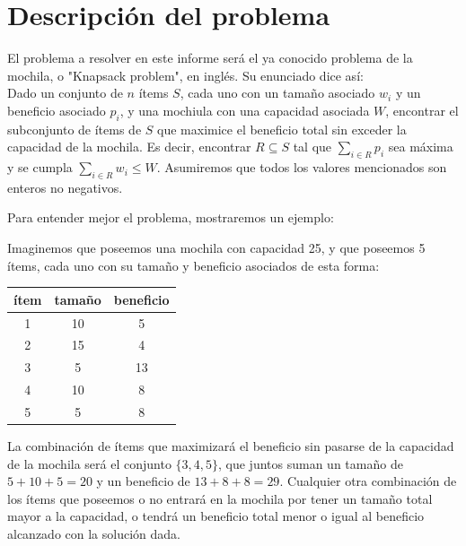 \documentclass[10pt, a4paper]{article}
\begin{document}


\maketitle

\setcounter{page}{1}
\tableofcontents

\pagebreak


\section{Descripci\'on del problema}

El problema a resolver en este informe será el ya conocido problema de la mochila, o "Knapsack problem", en inglés. Su enunciado dice así: \\
Dado un conjunto de $n$ ítems $S$, cada uno con un tamaño asociado $w_i$ y un beneficio asociado $p_i$, y una mochiula con una capacidad asociada $W$, encontrar el subconjunto de ítems de $S$ que maximice el beneficio total sin exceder la capacidad de la mochila. Es decir, encontrar $R \subseteq S$ tal que $\sum_{i \in R} p_i$ sea máxima y se cumpla $\sum_{i \in R} w_i \leq W$. Asumiremos que todos los valores mencionados son enteros no negativos.\par

Para entender mejor el problema, mostraremos un ejemplo: \par
Imaginemos que poseemos una mochila con capacidad 25, y que poseemos 5 ítems, cada uno con su tamaño y beneficio asociados de esta forma:

\begin{center}
\begin{tabular}{c|c|c}
	ítem & tamaño & beneficio \\ \hline
	1 & 10 & 5 \\
	2 & 15 & 4 \\
	3 & 5 & 13 \\
	4 & 10 & 8 \\
	5 & 5 & 8
\end{tabular}
\end{center}

La combinación de ítems que maximizará el beneficio sin pasarse de la capacidad de la mochila será el conjunto $\{3, 4, 5\}$, que juntos suman un tamaño de $5 + 10 + 5 = 20$ y un beneficio de $13 + 8 + 8 = 29$. Cualquier otra combinación de los ítems que poseemos o no entrará en la mochila por tener un tamaño total mayor a la capacidad, o tendrá un beneficio total menor o igual al beneficio alcanzado con la solución dada. \par
\end{document}
